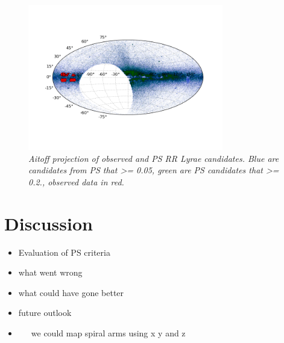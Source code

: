 \documentclass[aps,prl,twocolumn,superscriptaddress]{revtex4-1}
\begin{document}
\begin{figure}[H]
	\centering
		\includegraphics[width=3.35in]{figures/aitoff/Obs_PS_lsum_aitoff_map.png}
		\caption{\it \small{Aitoff projection of observed and PS RR Lyrae candidates.  Blue are candidates from PS that >= 0.05, green are PS candidates that >= 0.2., observed data in red.}}%
	\label{fig:aitoff_nosimbad}
\end{figure}


\section{Discussion}
\begin{itemize}
	\item{} Evaluation of PS criteria
	\item{} what went wrong
	\item{} what could have gone better
	\item{} future outlook
	\item{}~~~we could map spiral arms using x y and z
\end{itemize}

	
\end{document}
